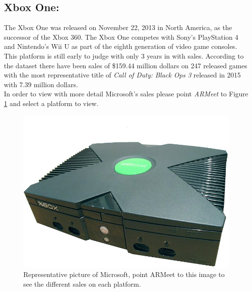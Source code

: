 \subsection{Xbox One:}
The Xbox One was released on November 22, 2013 in North America, as the
successor of the Xbox 360. The Xbox One competes with Sony's PlayStation 4
and Nintendo's Wii U as part of the eighth generation of video game
consoles\cite{Microsoft}.\\
This platform is still early to judge with only 3 years in with
sales. According to the dataset there have been sales of \$159.44 million
dollars on 247 released games with the most representative title of
\textit{Call of Duty: Black Ops 3} released in 2015 with 7.39 million
dollars.\\

In order to view with more detail Microsoft's sales please point
\textit{ARMeet} to Figure \ref{fig:MicrosoftImage} and select a platform to view.

\begin{figure}[h]
  \centering
  \centerline{\includegraphics[scale=0.35]{images/MicrosoftMainTarget.png}}
  \caption{Representative picture of Microsoft, point ARMeet to this image to
    see the different sales on each platform.}
  \label{fig:MicrosoftImage}
\end{figure}



